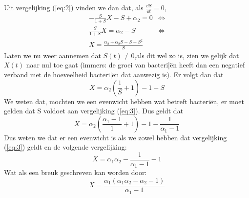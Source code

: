 Uit vergelijking (\ref{eq:2}) vinden we dan dat, als $\tfrac{\dd S}{\dd t} = 0$,
\begin{align*}
	- \frac{S}{1 + S}X - S + \alpha_2 = 0 		&\iff \\
	\frac{S}{1 + S}X = \alpha_2 - S 			&\iff \\
	X = \frac{\alpha_2 + \alpha_2 S - S - S^2}{S}
\end{align*}
Laten we nu weer aannemen dat $S(t) \not = 0$,als dit wel zo is, zien we gelijk dat $X(t)$ naar nul toe gaat (immers: de groei van bacteri|\"en heeft dan een negatief verband met de hoeveelheid bacteri|\"en dat aanwezig is). Er volgt dan dat
\begin{equation*}
	X = \alpha_2 \left( \frac{1}{S} + 1 \right) - 1 - S		
\end{equation*}
We weten dat, mochten we een evenwicht hebben wat betreft bacteri\"en, er moet gelden dat S voldoet aan vergelijking (\ref{eq:3}). Dus geldt dat
\begin{equation*}
	X = \alpha_2 \left( \frac{\alpha_1 - 1}{1} + 1 \right) - 1 - \frac{1}{\alpha_1 - 1}
\end{equation*}
Dus weten we dat er een evenwicht is als we zowel hebben dat vergelijking (\ref{eq:3}) geldt en de volgende vergelijking:
\begin{equation*}
	X = \alpha_1\alpha_2 - \frac{1}{\alpha_1 - 1} - 1
\end{equation*}
Wat als een breuk geschreven kan worden door:
\begin{equation}
	X = \frac{ \alpha_1(\alpha_1 \alpha_2 - \alpha_2 - 1)}{ \alpha_1 - 1} 		\label{eq:4}
\end{equation}